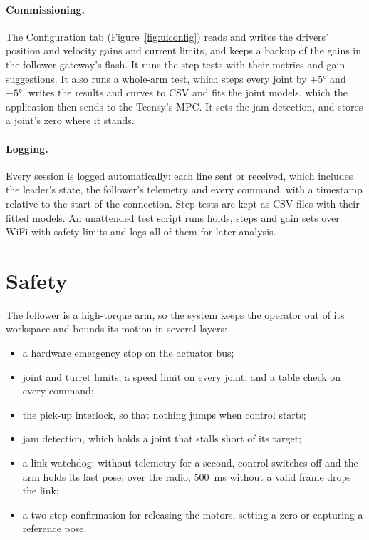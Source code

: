 \documentclass[11pt,a4paper]{article}
\begin{document}
\paragraph{Commissioning.} The Configuration tab (Figure~\ref{fig:uiconfig}) reads and writes the drivers'
position and velocity gains and current limits, and keeps a backup of the gains in the follower gateway's
flash. It runs the step tests with their metrics and gain suggestions. It also runs a whole-arm test, which steps
every joint by $+\ang{5}$ and $-\ang{5}$, writes the results and curves to CSV and fits the joint models, which
the application then sends to the Teensy's MPC. It sets the jam detection, and stores a joint's zero where it
stands.

\paragraph{Logging.} Every session is logged automatically: each line sent or received, which includes the
leader's state, the follower's telemetry and every command, with a timestamp relative to the start of the
connection. Step tests are kept as CSV files with their fitted models. An unattended test script runs holds,
steps and gain sets over WiFi with safety limits and logs all of them for later analysis.

\section{Safety}

The follower is a high-torque arm, so the system keeps the operator out of its workspace and bounds its motion
in several layers:
\begin{itemize}
\item a hardware emergency stop on the actuator bus;
\item joint and turret limits, a speed limit on every joint, and a table check on every command;
\item the pick-up interlock, so that nothing jumps when control starts;
\item jam detection, which holds a joint that stalls short of its target;
\item a link watchdog: without telemetry for a second, control switches off and the arm holds its last pose;
      over the radio, \SI{500}{\milli\second} without a valid frame drops the link;
\item a two-step confirmation for releasing the motors, setting a zero or capturing a reference pose.
\end{itemize}
\end{document}

